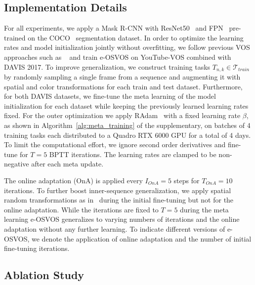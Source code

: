 \documentclass{article}
\begin{document}
\subsection{Implementation Details}  \label{sec:imp_details}

    For all experiments, we apply a Mask R-CNN with ResNet50~\cite{DBLP:journals/corr/HeZRS15} and FPN~\cite{FPN_2017_CVPR} pre-trained on the COCO~\cite{ms_coco} segmentation dataset.
In order to optimize the learning rates and model initialization jointly without overfitting, we follow previous VOS approaches such as ~\cite{voigtlaender2019feelvos,stm} and train e-OSVOS on YouTube-VOS combined with DAVIS 2017.
To improve generalization, we construct training tasks $T_{n, k} \in \mathcal{T}_{train}$ by randomly sampling a single frame from a sequence and augmenting it with spatial and color transformations for each train and test dataset.
Furthermore, for both DAVIS datasets, we fine-tune the meta learning of the model initialization for each dataset while keeping the previously learned learning rates fixed.
For the outer optimization we apply RAdam~\cite{liu2019radam} with a fixed learning rate $\beta$, as shown in Algorithm~\ref*{alg:meta_training} of the supplementary, on batches of 4 training tasks each distributed to a Quadro RTX 6000 GPU for a total of 4 days.
To limit the computational effort, we ignore second order derivatives and fine-tune for $T=5$ BPTT iterations. The learning rates are clamped to be non-negative after each meta update.

    The online adaptation (OnA) is applied every $I_{OnA}=5$ steps for $T_{OnA}=10$ iterations.
To further boost inner-sequence generalization, we apply spatial random transformations as in~\cite{OSVOS} during the initial fine-tuning but not for the online adaptation.
While the iterations are fixed to $T=5$ during the meta learning e-OSVOS generalizes to varying numbers of iterations and the online adaptation without any further learning.
To indicate different versions of e-OSVOS, we denote the application of online adaptation and the number of initial fine-tuning iterations.

\subsection{Ablation Study}
\end{document}
